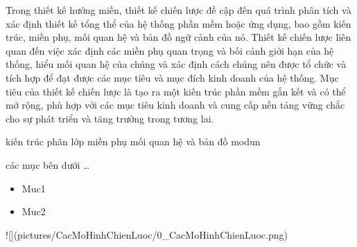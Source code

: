 
Trong thiết kế hướng miền, thiết kế chiến lược đề cập đến quá trình phân tích và xác định thiết kế tổng thể của hệ thống phần mềm hoặc ứng dụng, bao gồm kiến trúc, miền phụ, mối quan hệ và bản đồ ngữ cảnh của nó. Thiết kế chiến lược liên quan đến việc xác định các miền phụ quan trọng và bối cảnh giới hạn của hệ thống, hiểu mối quan hệ của chúng và xác định cách chúng nên được tổ chức và tích hợp để đạt được các mục tiêu và mục đích kinh doanh của hệ thống. Mục tiêu của thiết kế chiến lược là tạo ra một kiến trúc phần mềm gắn kết và có thể mở rộng, phù hợp với các mục tiêu kinh doanh và cung cấp nền tảng vững chắc cho sự phát triển và tăng trưởng trong tương lai.

%
kiến trúc phân lớp
miền phụ
mối quan hệ và bản đồ
modun

các mục bên dưới \dots

\begin{itemize}
\item Muc1
\item Muc2
\end{itemize}




![](pictures/CacMoHinhChienLuoc/0_CacMoHinhChienLuoc.png)







